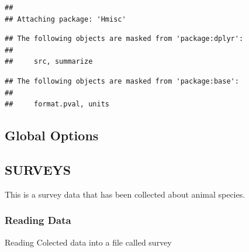 \documentclass[]{article}
\newenvironment{Shaded}{\begin{snugshade}}{\end{snugshade}}
\newcommand{\KeywordTok}[1]{\textcolor[rgb]{0.13,0.29,0.53}{\textbf{#1}}}
\newcommand{\DataTypeTok}[1]{\textcolor[rgb]{0.13,0.29,0.53}{#1}}
\newcommand{\DecValTok}[1]{\textcolor[rgb]{0.00,0.00,0.81}{#1}}
\newcommand{\StringTok}[1]{\textcolor[rgb]{0.31,0.60,0.02}{#1}}
\newcommand{\CommentTok}[1]{\textcolor[rgb]{0.56,0.35,0.01}{\textit{#1}}}
\newcommand{\OtherTok}[1]{\textcolor[rgb]{0.56,0.35,0.01}{#1}}
\newcommand{\OperatorTok}[1]{\textcolor[rgb]{0.81,0.36,0.00}{\textbf{#1}}}
\newcommand{\NormalTok}[1]{#1}
\begin{document}
\begin{verbatim}
## 
## Attaching package: 'Hmisc'
\end{verbatim}

\begin{verbatim}
## The following objects are masked from 'package:dplyr':
## 
##     src, summarize
\end{verbatim}

\begin{verbatim}
## The following objects are masked from 'package:base':
## 
##     format.pval, units
\end{verbatim}

\subsection{Global Options}\label{global-options}

\begin{Shaded}
\end{Shaded}

\subsection{SURVEYS}\label{surveys}

This is a survey data that has been collected about animal species.

\subsubsection{Reading Data}\label{reading-data}

Reading Colected data into a file called survey

\begin{Shaded}
\end{Shaded}
\end{document}
